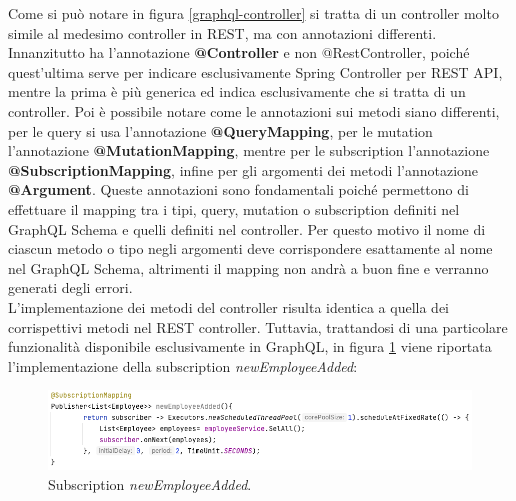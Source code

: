 Come si può notare in figura \ref{graphql-controller} si tratta di un controller molto simile al medesimo controller in REST, ma con annotazioni differenti. Innanzitutto ha l'annotazione \textbf{@Controller} e non @RestController, poiché quest'ultima serve per indicare esclusivamente Spring Controller per REST API, mentre la prima è più generica ed indica esclusivamente che si tratta di un controller. Poi è possibile notare come le annotazioni sui metodi siano differenti, per le query si usa l'annotazione \textbf{@QueryMapping}, per le mutation l'annotazione \textbf{@MutationMapping}, mentre per le subscription l'annotazione \textbf{@SubscriptionMapping}, infine per gli argomenti dei metodi l'annotazione \textbf{@Argument}. Queste annotazioni sono fondamentali poiché permettono di effettuare il mapping tra i tipi, query, mutation o subscription definiti nel GraphQL Schema e quelli definiti nel controller. Per questo motivo il nome di ciascun metodo o tipo negli argomenti deve corrispondere esattamente al nome nel GraphQL Schema, altrimenti il mapping non andrà a buon fine e verranno generati degli errori.\\
L'implementazione dei metodi del controller risulta identica a quella dei corrispettivi metodi nel REST controller. Tuttavia, trattandosi di una particolare funzionalità disponibile esclusivamente in GraphQL, in figura \ref{subscription-graphql} viene riportata l'implementazione della subscription \textit{newEmployeeAdded}:
\FloatBarrier
\begin{figure}[!ht]
\centering
\includegraphics[width=1\linewidth]{immagini/newEmployeeAdded.png}
\caption{Subscription \textit{newEmployeeAdded}.}
\label{subscription-graphql}
\end{figure}
